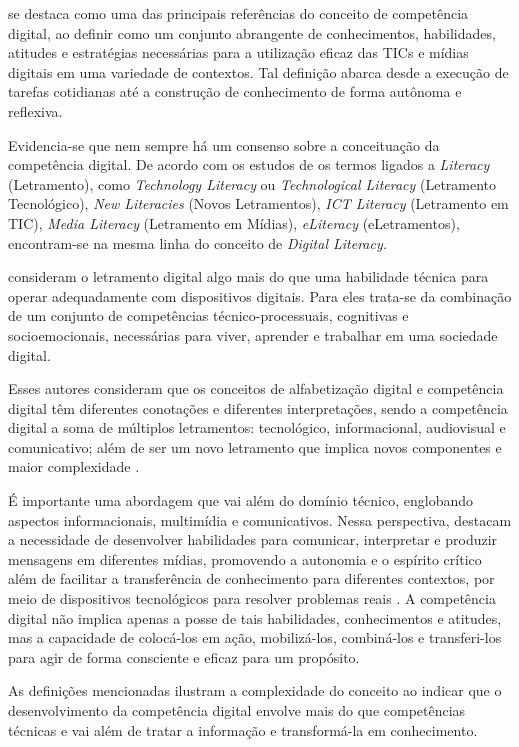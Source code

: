 \documentclass[portuguese]{textolivre}
\begin{document}
\textcite{ferrari2012} se destaca como uma das principais referências do
conceito de competência digital, ao definir como um conjunto abrangente
de conhecimentos, habilidades, atitudes e estratégias necessárias para a
utilização eficaz das TICs e mídias digitais em uma variedade de
contextos. Tal definição abarca desde a execução de tarefas cotidianas
até a construção de conhecimento de forma autônoma e reflexiva.

Evidencia-se que nem sempre há um consenso sobre a
conceituação da competência digital. De acordo com os estudos de \textcite{silva2019a} os termos ligados a \emph{Literacy }(Letramento), como
\emph{Technology Literacy} ou \emph{Technological Literacy} (Letramento
Tecnológico), \emph{New Literacies} (Novos Letramentos), \emph{ICT
Literacy} (Letramento em TIC), \emph{Media Literacy} (Letramento em
Mídias), \emph{eLiteracy} (eLetramentos), encontram-se na mesma linha do
conceito de \emph{Digital Literacy.}

\textcite{redecker2012} consideram o letramento digital algo
mais do que uma habilidade técnica para operar adequadamente com
dispositivos digitais. Para eles trata-se da combinação de um conjunto
de competências técnico-processuais, cognitivas e socioemocionais,
necessárias para viver, aprender e trabalhar em uma sociedade digital.

Esses autores consideram que os conceitos de alfabetização digital e
competência digital têm diferentes conotações e diferentes
interpretações, sendo a competência digital a soma de múltiplos
letramentos: tecnológico, informacional, audiovisual e comunicativo;
além de ser um novo letramento que implica novos componentes e maior
complexidade \cite{ferrari2012}.

É importante uma abordagem que vai além do domínio técnico, englobando
aspectos informacionais, multimídia e comunicativos. Nessa perspectiva,
\textcite{gewerc2015} destacam a necessidade de desenvolver
habilidades para comunicar, interpretar e produzir mensagens em
diferentes mídias, promovendo a autonomia e o espírito crítico além de
facilitar a transferência de conhecimento para diferentes contextos, por
meio de dispositivos tecnológicos para resolver problemas reais
\cite{gewerc2015}. A competência digital não implica apenas a posse de
tais habilidades, conhecimentos e atitudes, mas a capacidade de
colocá-los em ação, mobilizá-los, combiná-los e transferi-los para agir
de forma consciente e eficaz para um propósito.

As definições mencionadas ilustram a complexidade do conceito ao indicar
que o desenvolvimento da competência digital envolve mais do que
competências técnicas e vai além de tratar a informação e transformá-la
em conhecimento.
\end{document}
